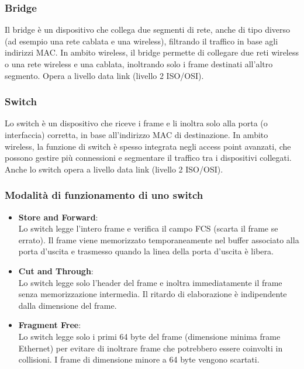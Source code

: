 \subsubsection{Bridge}
Il bridge è un dispositivo che collega due segmenti di rete, anche di tipo diverso (ad esempio una rete cablata e una wireless), filtrando il traffico in base agli indirizzi MAC. In ambito wireless, il bridge permette di collegare due reti wireless o una rete wireless e una cablata, inoltrando solo i frame destinati all'altro segmento. Opera a livello data link (livello 2 ISO/OSI).

\subsubsection{Switch}
Lo switch è un dispositivo che riceve i frame e li inoltra solo alla porta (o interfaccia) corretta, in base all'indirizzo MAC di destinazione. In ambito wireless, la funzione di switch è spesso integrata negli access point avanzati, che possono gestire più connessioni e segmentare il traffico tra i dispositivi collegati. Anche lo switch opera a livello data link (livello 2 ISO/OSI).
\subsubsection{Modalità di funzionamento di uno switch}

\begin{itemize}
    \item \textbf{Store and Forward}:\\
    Lo switch legge l'intero frame e verifica il campo FCS (scarta il frame se errato). Il frame viene memorizzato temporaneamente nel buffer associato alla porta d’uscita e trasmesso quando la linea della porta d’uscita è libera.
    \item \textbf{Cut and Through}:\\
    Lo switch legge solo l'header del frame e inoltra immediatamente il frame senza memorizzazione intermedia. Il ritardo di elaborazione è indipendente dalla dimensione del frame.
    \item \textbf{Fragment Free}:\\
    Lo switch legge solo i primi 64 byte del frame (dimensione minima frame Ethernet) per evitare di inoltrare frame che potrebbero essere coinvolti in collisioni. I frame di dimensione minore a 64 byte vengono scartati.
\end{itemize}
